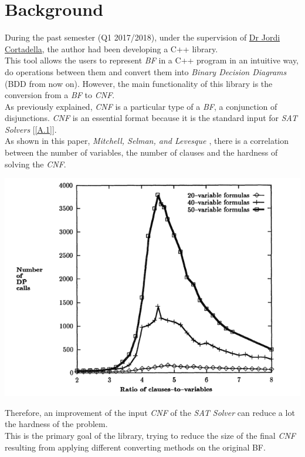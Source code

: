 \section{Background}

During the past semester (Q1 2017/2018), under the supervision of \href{https://www.cs.upc.edu/~jordicf/}{Dr Jordi Cortadella}, the author had been developing a C++ library.\\
This tool allows the users to represent \emph{BF} in a C++ program in an intuitive way, do operations between them and convert them into \emph{Binary Decision Diagrams} (BDD from now on). However, the main functionality of this library is the conversion from a \emph{BF} to \emph{CNF}.  \\
As previously explained, \emph{CNF} is a particular type of a \emph{BF}, a conjunction of disjunctions. \emph{CNF} is an essential format because it is the standard input for \emph{SAT Solvers} [\ref{A.1}].\\
As shown in this paper, \emph{Mitchell, Selman, and Levesque \cite{Mitchell}}, there is a correlation between the number of variables, the number of clauses and the hardness of solving the \emph{CNF}.
\begin{center}
	\includegraphics[width=1\textwidth]{Figures/GraphMitchellSelmanLevesque.png}
\end{center}
Therefore, an improvement of the input \emph{CNF} of the \emph{SAT Solver} can reduce a lot the hardness of the problem. \\
This is the primary goal of the library, trying to reduce the size of the final \emph{CNF} resulting from applying different converting methods on the original BF.


